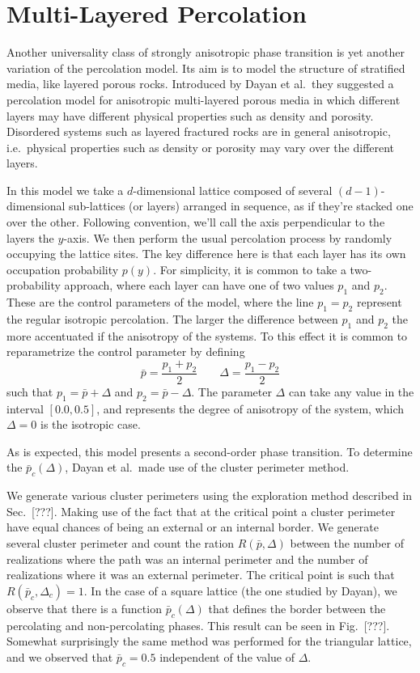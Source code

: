 \section{Multi-Layered Percolation}
\label{sec:mlp}

Another universality class of strongly anisotropic phase transition is yet
another variation of the percolation model. Its aim is to model the structure
of stratified media, like layered porous rocks. Introduced by Dayan et al.\,
they suggested a percolation model for anisotropic multi-layered porous media
in which different layers may have different physical properties such as
density and porosity. Disordered systems such as layered fractured rocks are in
general anisotropic, i.e.\ physical properties such as density or porosity may
vary over the different layers.

In this model we take a $d$-dimensional lattice composed of several
$(d-1)$-dimensional sub-lattices (or layers) arranged in sequence, as if
they're stacked one over the other. Following convention, we'll call the axis
perpendicular to the layers the $y$-axis. We then perform the usual percolation
process by randomly occupying the lattice sites. The key difference here is
that each layer has its own occupation probability $p(y)$.
For simplicity, it is common to take a two-probability approach, where
each layer can have one of two values $p_1$ and $p_2$. These are
the control parameters of the model, where the line $p_1=p_2$ represent
the regular isotropic percolation. The larger the difference between
$p_1$ and $p_2$ the more accentuated if the anisotropy of the systems.
To this effect it is common to reparametrize the control parameter
by defining
\begin{equation}
    \bar{p}=\frac{p_1 + p_2}{2}\;\;\;\;\;\;\;\Delta=\frac{p_1 - p_2}{2}
\end{equation}
such that $p_1 = \bar{p} + \Delta$ and $p_2 = \bar{p} - \Delta$. 
The parameter $\Delta$ can take any value in the interval $[0.0,0.5]$,
and represents the degree of anisotropy of the system, which $\Delta=0$
is the isotropic case. 

As is expected, this model presents a second-order phase transition.
To determine the $\bar{p}_c(\Delta)$, Dayan et al.\ made use of the
cluster perimeter method.

We generate various cluster perimeters using the exploration method described
in Sec.~[???]. Making use of the fact that at the critical point a cluster
perimeter have equal chances of being an external or an internal border. We
generate several cluster perimeter and count the ration $R(\bar{p}, \Delta)$
between the number of realizations where the path was an internal perimeter and
the number of realizations where it was an external perimeter. The critical
point is such that $R(\bar{p}_c, \Delta_c)=1$. In the case of a square lattice
(the one studied by Dayan), we observe that there is a function
$\bar{p}_c(\Delta)$ that defines the border between the percolating and
non-percolating phases. This result can be seen in Fig.~[???]. Somewhat
surprisingly the same method was performed for the triangular lattice, and we
observed that $\bar{p}_c=0.5$ independent of the value of $\Delta$.

